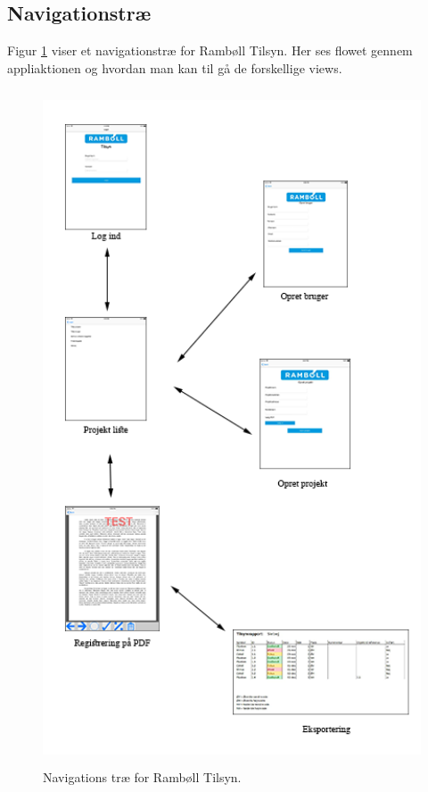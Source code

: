 \subsection{Navigationstræ}
Figur \ref{fig:Navi} viser et navigationstræ for Rambøll Tilsyn. Her ses flowet gennem appliaktionen og hvordan man kan til gå de forskellige views.

\begin{figure}[H] %
	\centering
	\includegraphics[height=20cm, width=12cm]{../ArkitekturDesign/Design/Navigation/Navigation}
	\caption{Navigations træ for Rambøll Tilsyn.}
	\label{fig:Navi}
\end{figure}

\clearpage
